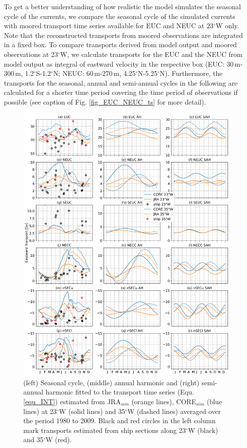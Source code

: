 \documentclass[os, manuscript]{copernicus}
\begin{document}
	To get a better understanding of how realistic the model simulates the seasonal cycle of the currents, we compare the seasonal cycle of the simulated currents with moored transport time series available for EUC and NEUC at 23$^{\circ}$W only. Note that the reconstructed transports from moored observations are integrated in a fixed box. To compare transports derived from model output and moored observations at 23$^{\circ}$W, we calculate transports for the EUC and the NEUC from model output as integral of eastward velocity in the respective box (EUC: 30$\,$m-300$\,$m, 1.2$^{\circ}$S-1.2$^{\circ}$N; NEUC: 60$\,$m-270$\,$m, 4.25$^{\circ}$N-5.25$^{\circ}$N). Furthermore, the transports for the seasonal, annual and semi-annual cycles in the following are calculated for a shorter time period covering the time period of observations if possible (see caption of Fig. \ref{fig_EUC_NEUC_ts} for more detail).
	
	\begin{figure}[t]
		\includegraphics[width=12cm]{../../figures/paper/f04_Currents_INT_model_mooring_seas_cyc_JRA1980_2009_CORE1980_2009.png}
		\caption{(left) Seasonal cycle, (middle) annual harmonic and (right) semi-annual harmonic fitted to the transport time series (Equ. \ref{equ_INT}) estimated from JRA$_{sim}$ (orange lines), CORE$_{sim}$ (blue lines) at 23$^{\circ}$W (solid lines) and 35$^{\circ}$W (dashed lines) averaged over the period 1980 to 2009. Black and red circles in the left column mark transports estimated from ship sections along 23$^{\circ}$W (black) and 35$^{\circ}$W (red).}
		\label{fig_seas_cyc_all}
	\end{figure} 
	
\end{document}
